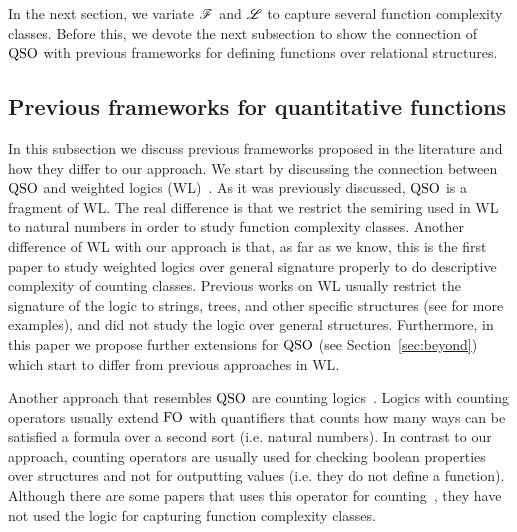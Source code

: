 
In the next section, we variate $\mathscr{F}$ and $\mathscr{L}$ to capture several function complexity classes. Before this, we devote the next subsection to show the connection of ${\rm QSO}$ with previous frameworks for defining functions over relational structures.

\subsection{Previous frameworks for quantitative functions} \label{sec:previous}

In this subsection we discuss previous frameworks proposed in the literature and how they differ to our approach.
We start by discussing the connection between ${\rm QSO}$ and weighted logics (WL)~\cite{DrosteG07}. 
As it was previously discussed, ${\rm QSO}$ is a fragment of WL.
The real difference is that we restrict the semiring used in WL to natural numbers in order to study function complexity classes.
Another difference of WL with our approach is that, as far as we know, this is the first paper to study weighted logics over general signature properly to do descriptive complexity of counting classes. 
Previous works on WL usually restrict the signature of the logic to strings, trees, and other specific structures (see \cite{droste2009handbook} for more examples), and did not study the logic over general structures. 
Furthermore, in this paper we propose further extensions for ${\rm QSO}$ (see Section~\ref{sec:beyond}) which start to differ from previous approaches in WL.

Another approach that resembles ${\rm QSO}$ are counting logics~\cite{L04,counting-paper-here}. 
Logics with counting operators usually extend ${\rm FO}$ with quantifiers that counts how many ways can be satisfied a formula over a second sort (i.e. natural numbers). 
In contrast to our approach, counting operators are usually used for checking boolean properties over structures and not for outputting values (i.e. they do not define a function).
Although there are some papers that uses this operator for counting~\cite{XXX}, they have not used the logic for capturing function complexity classes.



